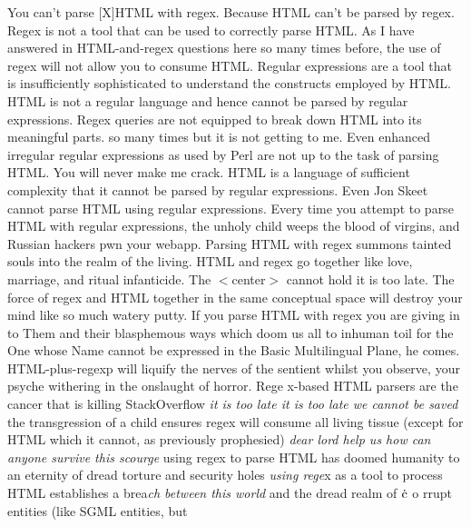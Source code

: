 \parskip=0pt
You can't parse [X]HTML with regex. Because HTML can't be parsed by
regex. Regex is not a tool that can be used to correctly parse
HTML\hbox{}. As I have answered in HTML-and-regex questions here so many
times before, the use of regex will not allow you to consume
HTML\hbox{}. Regular expressions are a tool that is insufficiently
sophisticated to understand the constructs employed by HTML\hbox{}. HTML is
not a regular language and hence cannot be parsed by regular
expressions. Regex queries are not equipped to break down HTML into
its meaningful parts. so many times but it is not getting to me. Even
enhanced irregular regular expressions as used by Perl are not up to
the task of parsing HTML\hbox{}. You will never make me crack. HTML is a
language of sufficient complexity that it cannot be parsed by regular
expressions. Even Jon Skeet cannot parse HTML using regular
expressions. Every time you attempt to parse HTML with regular
expressions, the unholy child weeps the blood of virgins, and Russian
hackers pwn your webapp. Parsing HTML with regex summons tainted souls
into the realm of the living. HTML and regex go together like love,
marriage, and ritual infanticide. The $<$center$>$ cannot hold it is too
late. The force of regex and HTML together in the same conceptual
space will destroy your mind like so much watery putty. If you parse
HTML with regex you are giving in to Them and their blasphemous ways
which doom us all to inhuman toil for the One whose Name cannot be
expressed in the Basic Multilingual Plane, he comes. HTML-plus-regexp
will liquify the nerves of the sentient whilst you observe, your
psyche withering in the onslaught of horror.
Rege\rayz{0pt}{$\bar{\phantom{e}}$}%
\rayz{1pt}{$\bar{\phantom{e}}$}%
\rayz{2pt}{$\grave{\phantom{e}}$}%
\rayz{3pt}{$\acute{\phantom{e}}$}x-based
HTML parsers are the cancer that is killing StackOverflow
{\it it is too late it is too
late we cannot be saved} the transgression of a
chil\rayz{6.5pt}{$\frown$}d
ensures regex
will consume all living tissue (except for HTML which it cannot, as
previously prophesied)
{\it dear lord help us how can anyone survive this
scourge} using regex to parse HTML has doomed humanity to an eternity
of dread torture and security holes {\it using rege}x as a tool to process
HTML establishes a brea{\it ch between this world} and the dread realm of
$\dot{\rm c}$\rayz{1pt}{$\hat{\phantom{c}}$}%
o\rayz{-1pt}{$^{{}^\varsigma}$}%
rrupt
entities (like SGML entities, but


